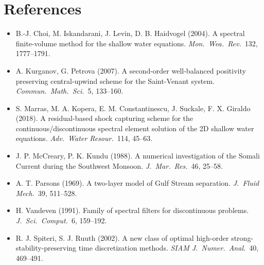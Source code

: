 \documentclass[11pt]{article}
\begin{document}
\section*{References}
\small
\begin{itemize}\setlength\itemsep{1pt}
\item B.-J. Choi, M. Iskandarani, J. Levin, D. B. Haidvogel (2004). A spectral
finite-volume method for the shallow water equations. \emph{Mon.\ Wea.\ Rev.}\
132, 1777--1791.
\item A. Kurganov, G. Petrova (2007). A second-order well-balanced positivity
preserving central-upwind scheme for the Saint-Venant system.
\emph{Commun.\ Math.\ Sci.}\ 5, 133--160.
\item S. Marras, M. A. Kopera, E. M. Constantinescu, J. Suckale,
F. X. Giraldo (2018). A residual-based shock capturing scheme for the
continuous/discontinuous spectral element solution of the 2D shallow water
equations. \emph{Adv.\ Water Resour.}\ 114, 45--63.
\item J. P. McCreary, P. K. Kundu (1988). A numerical investigation of the
Somali Current during the Southwest Monsoon. \emph{J.\ Mar.\ Res.}\ 46, 25--58.
\item A. T. Parsons (1969). A two-layer model of Gulf Stream separation.
\emph{J.\ Fluid Mech.}\ 39, 511--528.
\item H. Vandeven (1991). Family of spectral filters for discontinuous problems.
\emph{J.\ Sci.\ Comput.}\ 6, 159--192.
\item R. J. Spiteri, S. J. Ruuth (2002). A new class of optimal high-order
strong-stability-preserving time discretization methods.
\emph{SIAM J.\ Numer.\ Anal.}\ 40, 469--491.
\end{itemize}
\end{document}
